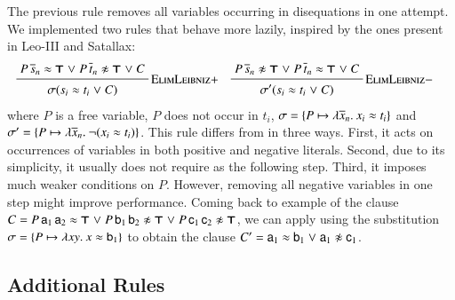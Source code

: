 The previous rule removes all variables occurring in disequations in one
attempt. We implemented two rules that behave more lazily, inspired by the ones present in Leo-III and
Satallax:
%
\begin{align*}
&\namedinference{ElimLeibniz$+$}
{P \, \tuplen{s} \eq \itrue \llor P \, \tuplen{t} \noteq \itrue \llor C}
{\sigmacl{s_i \eq t_i \llor C}}
&&
\namedinference{ElimLeibniz$-$}
{P \, \tuplen{s} \noteq \itrue \llor P \, \tuplen{t} \eq \itrue \llor C}
{\substcl{\sigma'}{s_i \eq t_i \llor C}}&
\end{align*}
%
where $P$ is a free variable, $P$ does not occur in $t_i$, $\sigma =
\{ P \mapsto \lambda \overline{x}_{n}.\> x_i \approx t_i \}$ and
$\sigma' = \{ P \mapsto \lambda \overline{x}_{n}.\> \neg (x_i \approx t_i) \}$. This
rule differs from  in three ways. First, it acts on
occurrences of variables in both positive and negative literals. Second,
due to its simplicity, it usually does not require  as the following step.
Third, it imposes much weaker conditions on $P$. However, removing all negative
variables in one step might improve performance.  Coming back to example of the clause $C = P \, \mathsf{a}_1 \, \mathsf{a}_2 \approx \pmb{\top} \mathrel\lor P \,
\mathsf{b}_1 \, \mathsf{b}_2 \not\approx \pmb{\top} \mathrel\lor P \, \mathsf{c}_1 \, \mathsf{c}_2 \not\approx
\pmb{\top}$, we can apply  using the substitution $\sigma = \{ P \mapsto \lambda xy.\> x \approx \mathsf{b}_1 \}$
to obtain the clause $C' = \mathsf{a}_1 \approx \mathsf{b}_1 \mathrel\lor \mathsf{a}_1 \not\approx \mathsf{c}_1$.

\subsection{Additional Rules}
\label{subsect:bool:core}
 
